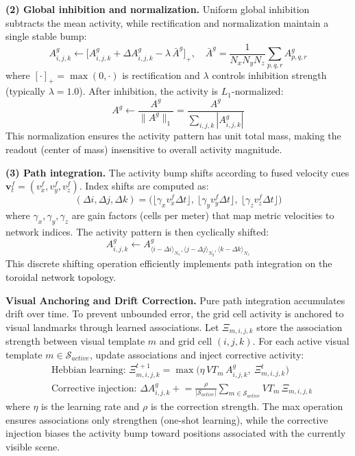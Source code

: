 \textbf{(2) Global inhibition and normalization.} Uniform global inhibition subtracts the mean activity, while rectification and normalization maintain a single stable bump:
\begin{equation}
    A^{g}_{i,j,k}\leftarrow \big[A^{g}_{i,j,k}+\Delta A^{g}_{i,j,k}-\lambda\,\bar A^{g}\big]_+,\quad \bar A^{g}=\frac{1}{N_xN_yN_z}\sum_{p,q,r}A^{g}_{p,q,r}
\end{equation}
where $[\cdot]_+ = \max(0, \cdot)$ is rectification and $\lambda$ controls inhibition strength (typically $\lambda=1.0$). After inhibition, the activity is $L_1$-normalized:
\begin{equation}
    A^{g}\leftarrow \frac{A^{g}}{\lVert A^{g}\rVert_1}=\frac{A^{g}}{\sum_{i,j,k}|A^{g}_{i,j,k}|}
\end{equation}
This normalization ensures the activity pattern has unit total mass, making the readout (center of mass) insensitive to overall activity magnitude.

\textbf{(3) Path integration.} The activity bump shifts according to fused velocity cues $\mathbf{v}^{f}_t = (v^f_x, v^f_y, v^f_z)$. Index shifts are computed as:
\begin{equation}
    (\Delta i,\Delta j,\Delta k)=\big(\lfloor \gamma_x v^f_x\Delta t\rfloor,\ \lfloor \gamma_y v^f_y\Delta t\rfloor,\ \lfloor \gamma_z v^f_z\Delta t\rfloor\big)
\end{equation}
where $\gamma_x, \gamma_y, \gamma_z$ are gain factors (cells per meter) that map metric velocities to network indices. The activity pattern is then cyclically shifted:
\begin{equation}
    A^{g}_{i,j,k}\leftarrow A^{g}_{\langle i-\Delta i\rangle_{N_x},\langle j-\Delta j\rangle_{N_y},\langle k-\Delta k\rangle_{N_z}}
\end{equation}
This discrete shifting operation efficiently implements path integration on the toroidal network topology.

\textbf{Visual Anchoring and Drift Correction.} Pure path integration accumulates drift over time. To prevent unbounded error, the grid cell activity is anchored to visual landmarks through learned associations. Let $\Xi_{m,i,j,k}$ store the association strength between visual template $m$ and grid cell $(i,j,k)$. For each active visual template $m \in \mathcal{S}_{active}$, update associations and inject corrective activity:
\begin{align}
     & \text{Hebbian learning: } \Xi_{m,i,j,k}^{t+1}=\max\big(\eta\,VT_m\,A^{g}_{i,j,k},\ \Xi_{m,i,j,k}^{t}\big)                                             \\
     & \text{Corrective injection: } \Delta A^{g}_{i,j,k} \mathrel{+}= \frac{\rho}{|\mathcal{S}_{active}|}\sum_{m\in\mathcal{S}_{active}}VT_m\,\Xi_{m,i,j,k}
\end{align}
where $\eta$ is the learning rate and $\rho$ is the correction strength. The max operation ensures associations only strengthen (one-shot learning), while the corrective injection biases the activity bump toward positions associated with the currently visible scene.


